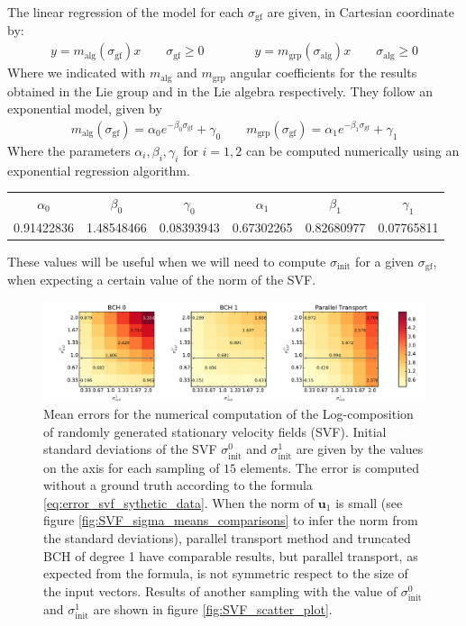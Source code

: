The linear regression of the model for each $\sigma_{\text{gf}}$ are given, in Cartesian coordinate by:
\begin{align}
y = m_{\text{alg}}( \sigma_{\text{gf}} )x \qquad  \sigma_{\text{gf}} \geq 0
\qquad
\qquad
y = m_{\text{grp}}( \sigma_{\text{alg}} )x \qquad  \sigma_{\text{alg}} \ge 0
\end{align}
Where we indicated with $m_{\text{alg}}$ and $m_{\text{grp}}$ angular coefficients for the results obtained in the Lie group and in the Lie algebra respectively. They follow an exponential model, given by
\begin{align}
m_{\text{alg}}( \sigma_{\text{gf}} )
=
\alpha_0 e^{-\beta_0 \sigma_{\text{gf}}} + \gamma_0 
\qquad
m_{\text{grp}}( \sigma_{\text{gf}} )
=
\alpha_1 e^{-\beta_1 \sigma_{\text{gf}}} + \gamma_1
\end{align}
Where the parameters $\alpha_i, \beta_i, \gamma_i$ for $i=1,2$ can be computed numerically using an exponential regression algorithm.
\begin{center}
	\begin{tabular}{ c  c c c c c}
	$\alpha_0$ & $\beta_0$ & $\gamma_0$ & $\alpha_1$ & $ \beta_1$ & $\gamma_1$ \\
	0.91422836 &  1.48548466 &  0.08393943 &  0.67302265 &  0.82680977 &  0.07765811
	\end{tabular}
\end{center}
These values will be useful when we will need to compute $\sigma_{\text{init}}$ for a given $\sigma_{\text{gf}}$, when expecting a certain value of the norm of the SVF.

\begin{figure}[!ht]
	\hspace{-2.1cm}
	\includegraphics[scale=0.55]{figures/SVF_image_scale.pdf}
	\caption{Mean errors for the numerical computation of the Log-composition of randomly generated stationary velocity fields (SVF). Initial standard deviations of the SVF $\sigma_{\text{init}}^{0}$ and $\sigma_{\text{init}}^{1}$ are given by the values on the axis for each sampling of $15$ elements. The error is computed without a ground truth according to the formula \ref{eq:error_svf_sythetic_data}. When the norm of $\mathbf{u}_1$ is small (see figure \ref{fig:SVF_sigma_means_comparisons} to infer the norm from the standard deviations), parallel transport method and truncated BCH of degree 1 have comparable results, but parallel transport, as expected from the formula, is not symmetric respect to the size of the input vectors. Results of another sampling with the value of $\sigma_{\text{init}}^{0}$ and $\sigma_{\text{init}}^{1}$ are shown in figure \ref{fig:SVF_scatter_plot}.}
	\label{fig:SVF_image_scale}
\end{figure}

